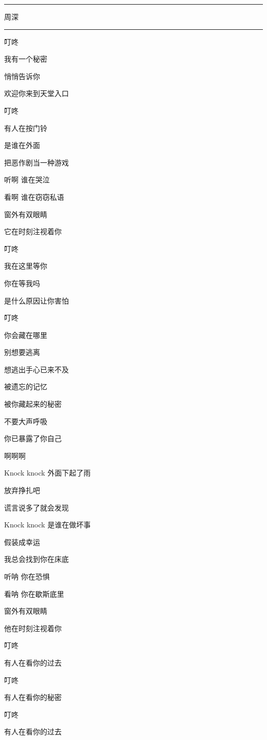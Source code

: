 \documentclass[]{ctexbook}
\begin{document}
\begin{center}\rule{0.5\linewidth}{0.5pt}\end{center}

周深

\begin{center}\rule{0.5\linewidth}{0.5pt}\end{center}

叮咚

我有一个秘密

悄悄告诉你

欢迎你来到天堂入口

叮咚

有人在按门铃

是谁在外面

把恶作剧当一种游戏

听啊 谁在哭泣

看啊 谁在窃窃私语

窗外有双眼睛

它在时刻注视着你

叮咚

我在这里等你

你在等我吗

是什么原因让你害怕

叮咚

你会藏在哪里

别想要逃离

想逃出手心已来不及

被遗忘的记忆

被你藏起来的秘密

不要大声呼吸

你已暴露了你自己

啊啊啊

Knock knock 外面下起了雨

放弃挣扎吧

谎言说多了就会发现

Knock knock 是谁在做坏事

假装成幸运

我总会找到你在床底

听呐 你在恐惧

看呐 你在歇斯底里

窗外有双眼睛

他在时刻注视着你

叮咚

有人在看你的过去

叮咚

有人在看你的秘密

叮咚

有人在看你的过去
\end{document}
